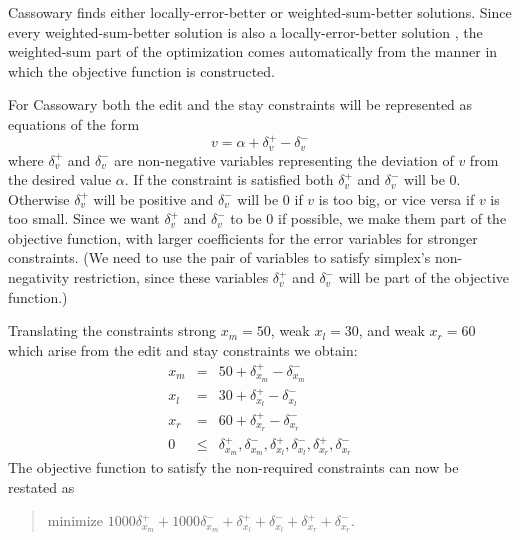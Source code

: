 \documentclass{article}
\newcommand{\strength}{\rm}
\begin{document}
Cassowary finds either locally-error-better or weighted-sum-better
solutions.  Since every weighted-sum-better solution is also a
locally-error-better solution \cite{borning-lisp-symbolic-computation-92},
the weighted-sum part of the optimization comes automatically from the
manner in which the objective function is constructed.

For Cassowary
both the edit and the stay constraints will be represented as equations of
the form  
$$v = \alpha + \delta_v^{+} - \delta_v^{-}$$
where $\delta_v^{+}$ and $\delta_v^{-}$ are non-negative variables
representing the
deviation of $v$ from the desired value $\alpha$.  If the constraint is
satisfied both $\delta_v^{+}$ and $\delta_v^{-}$ will be 0.  
Otherwise $\delta_v^{+}$ will be
positive and $\delta_v^{-}$ will be 0 if $v$ is too big, 
or vice versa if $v$ is
too small.  
Since we want $\delta_v^{+}$ and $\delta_v^{-}$ to be 0 if
possible, we make them part of the objective function, with larger
coefficients for the error variables for stronger constraints.
(We need to use the pair of variables to satisfy simplex's
non-negativity restriction, since these variables  $\delta_v^{+}$ and
$\delta_v^{-}$ will be part of the objective function.)  

Translating the constraints
{\strength strong} $x_m = 50$, 
{\strength weak} $x_l = 30$,
and {\strength weak} $x_r = 60$
which arise from the 
edit and stay constraints we obtain:
$$\begin{array}{rcl}
x_m & = &50 + \delta_{x_m}^+ -  \delta_{x_m}^- \\
x_l & = &30 + \delta_{x_l}^+ -  \delta_{x_l}^- \\
x_r &= &60 + \delta_{x_r}^+ -  \delta_{x_r}^- \\
0 &\leq& \delta_{x_m}^+, \delta_{x_m}^-, \delta_{x_l}^+, \delta_{x_l}^-, 
	\delta_{x_r}^+, \delta_{x_r}^-
\end{array}$$
The objective function to satisfy the
non-required constraints 
can now be restated as

\begin{quote}\vspace*{-1ex}
minimize $1000 \delta_{x_m}^+ + 1000  \delta_{x_m}^- + \delta_{x_l}^+ +  
	\delta_{x_l}^- + \delta_{x_r}^+ +  \delta_{x_r}^-$.
\end{quote}\vspace{-0.9ex}
\end{document}
